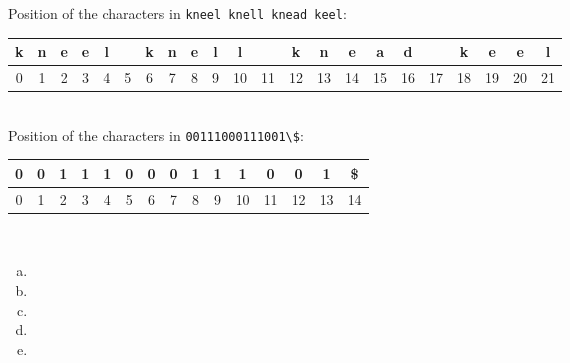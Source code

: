 \documentclass[12pt]{article}
\begin{document}
Position of the characters in \verb+kneel knell knead keel+:\\
\begin{tabular}{|c|c|c|c|c|c|c|c|c|c|c|c|c|c|c|c|c|c|c|c|c|c|}
\hline
k & n & e & e & l & & k & n & e & l & l & & k & n & e & a & d & & k & e & e & l\\\hline
0 & 1 & 2 & 3 & 4 & 5 & 6 & 7 & 8 & 9 & 10 & 11 & 12 & 13 & 14 & 15 & 16 & 17 & 18 & 19 & 20 & 21\\\hline
\end{tabular}\\

Position of the characters in \verb+00111000111001\$+:\\
\begin{tabular}{|c|c|c|c|c|c|c|c|c|c|c|c|c|c|c|}
\hline
0 & 0 & 1 & 1 & 1 & 0 & 0 & 0 & 1 & 1 & 1 & 0 & 0 & 1 & \$\\\hline
0 & 1 & 2 & 3 & 4 & 5 & 6 & 7 & 8 & 9 & 10 & 11 & 12 & 13 & 14\\\hline
\end{tabular}\\

\begin{enumerate}[(a)]
\clearpage
\item  \done
\clearpage
\item  \done
\clearpage
\item  \done
\item  \done
\item  \done
\end{enumerate}
\end{document}
